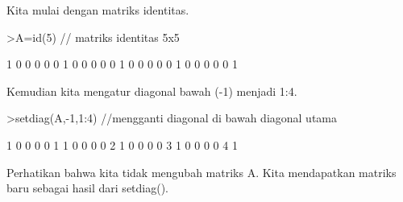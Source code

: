 \documentclass[12pt,arial,letterpaper]{book}
\begin{document}
\begin{eulercomment}
\begin{eulercomment}
\begin{eulercomment}
\begin{eulercomment}
\begin{eulercomment}
Kita mulai dengan matriks identitas.
\end{eulercomment}
\begin{eulerprompt}
>A=id(5) // matriks identitas 5x5
\end{eulerprompt}
\begin{euleroutput}
              1             0             0             0             0 
              0             1             0             0             0 
              0             0             1             0             0 
              0             0             0             1             0 
              0             0             0             0             1 
\end{euleroutput}
\begin{eulercomment}
Kemudian kita mengatur diagonal bawah (-1) menjadi 1:4.
\end{eulercomment}
\begin{eulerprompt}
>setdiag(A,-1,1:4) //mengganti diagonal di bawah diagonal utama
\end{eulerprompt}
\begin{euleroutput}
              1             0             0             0             0 
              1             1             0             0             0 
              0             2             1             0             0 
              0             0             3             1             0 
              0             0             0             4             1 
\end{euleroutput}
\begin{eulercomment}
Perhatikan bahwa kita tidak mengubah matriks A. Kita mendapatkan
matriks baru sebagai hasil dari setdiag().


\end{eulercomment}
\end{eulercomment}
\end{eulercomment}
\end{eulercomment}
\end{eulercomment}
\end{document}
